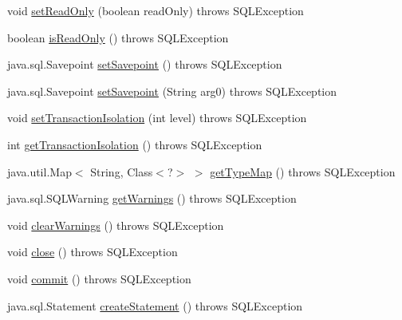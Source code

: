 \begin{DoxyCompactItemize}
\item 
void \mbox{\hyperlink{classcom_1_1mysql_1_1cj_1_1jdbc_1_1_connection_wrapper_ae9150565f43b006b5f70ca1d966b2456}{set\+Read\+Only}} (boolean read\+Only)  throws S\+Q\+L\+Exception 
\item 
boolean \mbox{\hyperlink{classcom_1_1mysql_1_1cj_1_1jdbc_1_1_connection_wrapper_ab2d583e2ce4875c55ce7b20f0cc655a0}{is\+Read\+Only}} ()  throws S\+Q\+L\+Exception 
\item 
java.\+sql.\+Savepoint \mbox{\hyperlink{classcom_1_1mysql_1_1cj_1_1jdbc_1_1_connection_wrapper_a0b5ee837ff9b67876252ab003c61bf98}{set\+Savepoint}} ()  throws S\+Q\+L\+Exception 
\item 
java.\+sql.\+Savepoint \mbox{\hyperlink{classcom_1_1mysql_1_1cj_1_1jdbc_1_1_connection_wrapper_a53a034a2e55c89f1271ef8b87819daed}{set\+Savepoint}} (String arg0)  throws S\+Q\+L\+Exception 
\item 
void \mbox{\hyperlink{classcom_1_1mysql_1_1cj_1_1jdbc_1_1_connection_wrapper_a05b64dd17c2bdf5c3f95f514bf00bf90}{set\+Transaction\+Isolation}} (int level)  throws S\+Q\+L\+Exception 
\item 
int \mbox{\hyperlink{classcom_1_1mysql_1_1cj_1_1jdbc_1_1_connection_wrapper_a5a460da4650ce588704afa3bc76f20e0}{get\+Transaction\+Isolation}} ()  throws S\+Q\+L\+Exception 
\item 
java.\+util.\+Map$<$ String, Class$<$?$>$ $>$ \mbox{\hyperlink{classcom_1_1mysql_1_1cj_1_1jdbc_1_1_connection_wrapper_a5937fe77552189bdc479b80bc84bf5df}{get\+Type\+Map}} ()  throws S\+Q\+L\+Exception 
\item 
java.\+sql.\+S\+Q\+L\+Warning \mbox{\hyperlink{classcom_1_1mysql_1_1cj_1_1jdbc_1_1_connection_wrapper_a645cbeafc87a13f65c6ca3596837ec10}{get\+Warnings}} ()  throws S\+Q\+L\+Exception 
\item 
void \mbox{\hyperlink{classcom_1_1mysql_1_1cj_1_1jdbc_1_1_connection_wrapper_a4113e07bce13394b2537c5f9e7aba3ae}{clear\+Warnings}} ()  throws S\+Q\+L\+Exception 
\item 
void \mbox{\hyperlink{classcom_1_1mysql_1_1cj_1_1jdbc_1_1_connection_wrapper_a1513ad5e208ca46ac61ab5359590a0b9}{close}} ()  throws S\+Q\+L\+Exception 
\item 
void \mbox{\hyperlink{classcom_1_1mysql_1_1cj_1_1jdbc_1_1_connection_wrapper_af0bc67720997910c2dec3f38b1796ec1}{commit}} ()  throws S\+Q\+L\+Exception 
\item 
java.\+sql.\+Statement \mbox{\hyperlink{classcom_1_1mysql_1_1cj_1_1jdbc_1_1_connection_wrapper_a7d05b731c9391bc085142ba228bad83a}{create\+Statement}} ()  throws S\+Q\+L\+Exception 

\end{DoxyCompactItemize}
